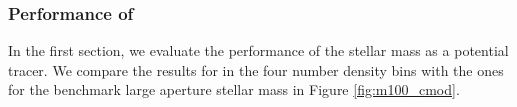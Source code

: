 \documentclass[a4paper,fleqn,usenatbib]{mnras}
\begin{document}
\subsubsection{Performance of \mcmodel{}}
    \label{sec:cmodel}


    In the first section, we evaluate the performance of the \cmodel{} stellar mass as a 
    potential \mvir{} tracer.
    We compare the results for \mcmodel{} in the four number density bins with the ones for 
    the benchmark large aperture stellar mass  in Figure \ref{fig:m100_cmod}.

\end{document}
